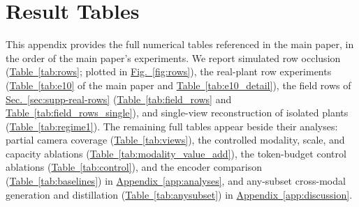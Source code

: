\documentclass[10pt,twocolumn,letterpaper]{article}
\newcommand{\updtwo}[1]{#1}
\newcommand{\figref}[1]{\hyperref[#1]{Fig.~\ref*{#1}}}
\newcommand{\tabref}[1]{\hyperref[#1]{Table~\ref*{#1}}}
\newcommand{\secref}[1]{\hyperref[#1]{Sec.~\ref*{#1}}}
\newcommand{\appendixref}[1]{\hyperref[#1]{Appendix~\ref*{#1}}}
\begin{document}
\section{Result Tables}
\label{app:tables}

This appendix provides the full numerical tables referenced in the main paper, in the order of the main paper's experiments. We report simulated row occlusion (\tabref{tab:rows}; plotted in \figref{fig:rows}), the real-plant row experiments (\tabref{tab:e10} of the main paper and \tabref{tab:e10_detail}), \updtwo{the field rows of \secref{sec:supp-real-rows} (\tabref{tab:field_rows} and \tabref{tab:field_rows_single}),} and single-view reconstruction of isolated plants (\tabref{tab:regime1}). The remaining full tables appear beside their analyses: partial camera coverage (\tabref{tab:views}), the controlled modality, scale, and capacity ablations (\tabref{tab:modality_value_add}), the token-budget control ablations (\tabref{tab:control}), and the encoder comparison (\tabref{tab:baselines}) in \appendixref{app:analyses}, and any-subset cross-modal generation and distillation (\tabref{tab:anysubset}) in \appendixref{app:discussion}.
\end{document}
